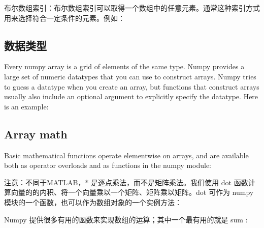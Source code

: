 \documentclass[10pt,a4paper]{article}
\begin{document}

布尔数组索引：布尔数组索引可以取得一个数组中的任意元素。通常这种索引方式用来选择符合一定条件的元素。例如：




\subsection{数据类型}

Every numpy array is a grid of elements of the same type. Numpy provides a large set of numeric datatypes that you can use to construct arrays. Numpy tries to guess a datatype when you create an array, but functions that construct arrays usually also include an optional argument to explicitly specify the datatype. Here is an example:


\subsection{Array math}

Basic mathematical functions operate elementwise on arrays, and are available both as operator overloads and as functions in the numpy module:







注意：不同于MATLAB，* 是逐点乘法，而不是矩阵乘法。我们使用 dot 函数计算向量的的内积、将一个向量乘以一个矩阵、矩阵乘以矩阵。dot 可作为 numpy 模块的一个函数，也可以作为数组对象的一个实例方法：



Numpy 提供很多有用的函数来实现数组的运算；其中一个最有用的就是 sum :



\end{document}
